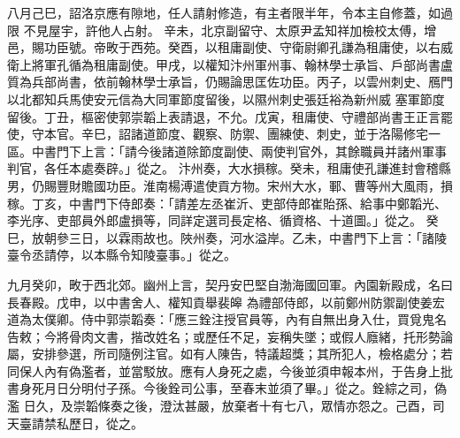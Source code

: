 \begin{pinyinscope}
八月己巳，詔洛京應有隙地，任人請射修造，有主者限半年，令本主自修蓋，如過限
 不見屋宇，許他人占射。
 辛未，北京副留守、太原尹孟知祥加檢校太傅，增邑，賜功臣號。帝畋于西苑。癸酉，以租庸副使、守衛尉卿孔謙為租庸使，以右威衛上將軍孔循為租庸副使。甲戌，以權知汴州軍州事、翰林學士承旨、戶部尚書盧質為兵部尚書，依前翰林學士承旨，仍賜論思匡佐功臣。丙子，以雲州刺史、鴈門以北都知兵馬使安元信為大同軍節度留後，以隰州刺史張廷裕為新州威
 塞軍節度留後。丁丑，樞密使郭崇韜上表請退，不允。戊寅，租庸使、守禮部尚書王正言罷使，守本官。辛巳，詔諸道節度、觀察、防禦、團練使、刺史，並于洛陽修宅一區。中書門下上言：「請今後諸道除節度副使、兩使判官外，其餘職員并諸州軍事判官，各任本處奏辟。」從之。
 汴州奏，大水損稼。癸未，租庸使孔謙進封會稽縣男，仍賜豐財贍國功臣。淮南楊溥遣使貢方物。宋州大水，鄆、曹等州大風雨，損稼。丁亥，中書門下侍郎奏：「請差左丞崔沂、吏部侍郎崔貽孫、給事中鄭韜光、李光序、吏部員外郎盧損等，同詳定選司長定格、循資格、十道圖。」從之。
 癸巳，放朝參三日，以霖雨故也。陜州奏，河水溢岸。乙未，中書門下上言：「諸陵臺令丞請停，以本縣令知陵臺事。」從之。



 九月癸卯，畋于西北郊。幽州上言，契丹安巴堅自渤海國回軍。內園新殿成，名曰長春殿。戊申，以中書舍人、權知貢舉裴皞
 為禮部侍郎，以前鄭州防禦副使姜宏道為太僕卿。侍中郭崇韜奏：「應三銓注授官員等，內有自無出身入仕，買覓鬼名告敕；今將骨肉文書，揩改姓名；或歷任不足，妄稱失墜；或假人廕緒，托形勢論屬，安排參選，所司隨例注官。如有人陳告，特議超獎；其所犯人，檢格處分；若同保人內有偽濫者，並當駁放。應有人身死之處，今後並須申報本州，于告身上批書身死月日分明付子孫。今後銓司公事，至春末並須了畢。」從之。銓綜之司，偽濫
 日久，及崇韜條奏之後，澄汰甚嚴，放棄者十有七八，眾情亦怨之。己酉，司天臺請禁私歷日，從之。




\end{pinyinscope}
